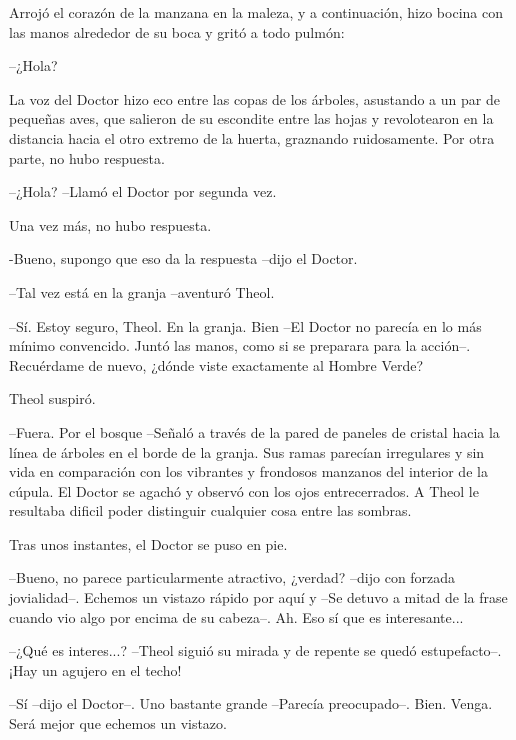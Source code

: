 Arrojó el corazón de la manzana en la maleza, y a continuación, hizo bocina con las manos alrededor de su boca y gritó a todo pulmón:

 --¿Hola?



La voz del Doctor hizo eco entre las copas de los árboles, asustando a un par de pequeñas aves, que salieron de su escondite entre las hojas y revolotearon en la distancia hacia el otro extremo de la huerta, graznando ruidosamente. Por otra parte, no hubo respuesta.



--¿Hola? --Llamó el Doctor por segunda vez.



Una vez más, no hubo respuesta.



-Bueno, supongo que eso da la respuesta --dijo el Doctor.



--Tal vez está en la granja --aventuró Theol.



--Sí. Estoy seguro, Theol. En la granja. Bien --El Doctor no parecía en lo más mínimo convencido. Juntó las manos, como si se preparara para la acción--. Recuérdame de nuevo, ¿dónde viste exactamente al Hombre Verde?



Theol suspiró.

--Fuera. Por el bosque --Señaló a través de la pared de paneles de cristal hacia la línea de árboles en el borde de la granja. Sus ramas parecían irregulares y sin vida en comparación con los vibrantes y frondosos manzanos del interior de la cúpula. El Doctor se agachó y observó con los ojos entrecerrados. A Theol le resultaba dificil poder distinguir cualquier cosa entre las sombras.



Tras unos instantes, el Doctor se puso en pie.

--Bueno, no parece particularmente atractivo, ¿verdad? --dijo con forzada jovialidad--. Echemos un vistazo rápido por aquí y --Se detuvo a mitad de la frase cuando vio algo por encima de su cabeza--. Ah. Eso sí que es interesante...



--¿Qué es interes...? --Theol siguió su mirada y de repente se quedó estupefacto--. ¡Hay un agujero en el techo!



--Sí --dijo el Doctor--. Uno bastante grande --Parecía preocupado--. Bien. Venga. Será mejor que echemos un vistazo.



